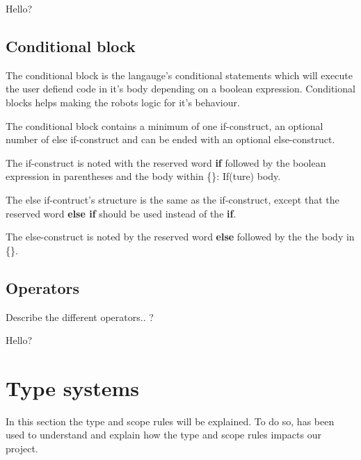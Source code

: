 \begin{defi}
Hello?
\end{defi}
\subsection{Conditional block}
The conditional block is the langauge's conditional statements which will execute the user defiend code in it's body depending on a boolean expression. Conditional blocks helps making the robots logic for it's behaviour. 

\begin{defi}
The conditional block contains a minimum of one if-construct, an optional number of else if-construct and can be ended with an optional else-construct. 

The if-construct is noted with the reserved word \textbf{if} followed by the boolean expression in parentheses and the body within \{\}: If(ture) {body}.

The else if-contruct's structure is the same as the if-construct, except that the reserved  word \textbf{else if} should be used instead of the \textbf{if}. 

The else-construct is noted by the reserved word \textbf{else} followed by the the body in \{\}.
\end{defi}
\subsection{Operators}
Describe the different operators.. ? 

\begin{defi}
Hello?
\end{defi}
\section{Type systems}
In this section the type and scope rules will be explained. To do so, \cite{Sebesta} has been used to understand and explain how the type and scope rules impacts our project.


